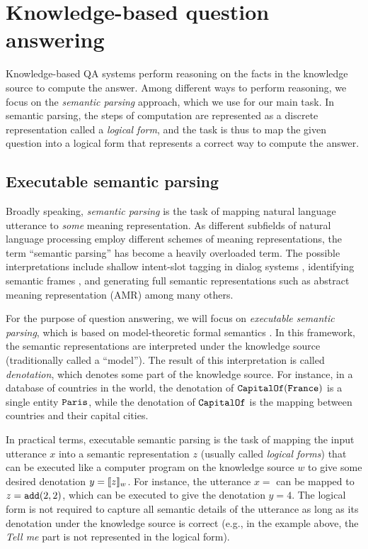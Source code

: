 \section{Knowledge-based question answering}
\label{sec:rw-knowledge-based-qa}

Knowledge-based QA systems perform reasoning on the facts
in the knowledge source
to compute the answer.
Among different ways to perform reasoning,
we focus on the \emph{semantic parsing} approach,
which we use for our main task.
In semantic parsing,
the steps of computation are represented as a discrete representation
called a \emph{logical form},
and the task is thus to map the given question into a logical form
that represents a correct way to compute the answer.

\subsection{Executable semantic parsing}

Broadly speaking,
\emph{semantic parsing} is the task of mapping
natural language utterance to \emph{some}
meaning representation.
As different subfields of natural language processing
employ different schemes of meaning representations,
the term ``semantic parsing''
has become a heavily overloaded term.
The possible interpretations include
shallow intent-slot tagging in dialog systems
\cite{pieraccini1991stochastic,raymond2007generative,mesnil2014using},
identifying semantic frames \cite{gildea02semantic,hermann2014semantic},
and
generating full semantic representations
such as abstract meaning representation (AMR) \cite{banarescu2013amr,flanigan2014discriminative,wang2015transition,artzi2015broad}
among many others.

For the purpose of question answering,
we will focus on \emph{executable semantic parsing},
which is based on
model-theoretic formal semantics \cite{montague73ptq}.
In this framework,
the semantic representations are interpreted under
the knowledge source (traditionally called a ``model'').
The result of this interpretation is called \emph{denotation},
which denotes some part of the knowledge source.
For instance,
in a database of countries in the world,
the denotation of $\texttt{CapitalOf}(\texttt{France})$
is a single entity $\texttt{Paris}$,
while the denotation of $\texttt{CapitalOf}$
is the mapping between countries and their capital cities.

In practical terms,
executable semantic parsing
is the task of mapping the input utterance $x$
into a semantic representation $z$
(usually called \emph{logical forms})
that can be executed like a computer program
on the knowledge source $w$
to give some desired denotation $y = \llbracket{z}\rrbracket_{w}$.
For instance, the utterance $x =$ 
can be mapped to $z = \texttt{add}(2, 2)$, which can be executed
to give the denotation $y = 4$.
The logical form is not required to capture
all semantic details of the utterance
as long as its denotation under the knowledge source is correct
(e.g., in the example above,
the \emph{Tell me} part is not represented
in the logical form).

